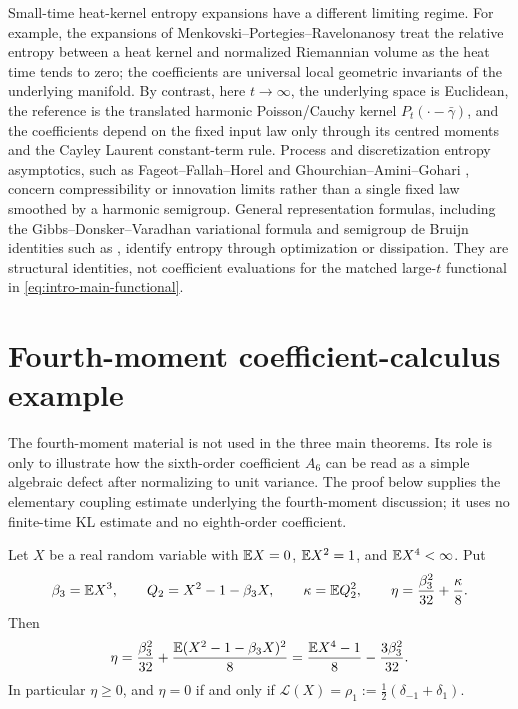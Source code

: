 Small-time heat-kernel entropy expansions have a different limiting regime.
For example, the expansions of
Menkovski--Portegies--Ravelonanosy
\cite{MenkovskiPortegiesRavelonanosy2024HeatKernelEntropy} treat the
relative entropy between a heat kernel and normalized Riemannian volume as the
heat time tends to zero; the coefficients are universal local geometric
invariants of the underlying manifold.  By contrast, here \(t\to\infty\), the
underlying space is Euclidean, the reference is the translated harmonic
Poisson/Cauchy kernel \(P_t(\cdot-\bar\gamma)\), and the coefficients depend
on the fixed input law only through its centred moments and the Cayley Laurent
constant-term rule.  Process and discretization entropy asymptotics, such as
Fageot--Fallah--Horel
\cite{FageotFallahHorel2022EntropicCompressibilityLevy} and
Ghourchian--Amini--Gohari
\cite{GhourchianAminiGohari2018InnovationCompressibility}, concern
compressibility or innovation limits rather than a single fixed law smoothed
by a harmonic semigroup.  General representation formulas, including the
Gibbs--Donsker--Varadhan variational formula
\cite{DonskerVaradhan1975AsymptoticI,DupuisEllis1997WeakConvergence} and
semigroup de Bruijn identities such as
\cite{DeBruijn1953,HirataNemotoYoshida2012IntegralRepresentation,
Yoshida2017RelativeEntropyDiffusion}, identify entropy through optimization
or dissipation.  They are structural identities, not coefficient evaluations
for the matched large-\(t\) functional in
\eqref{eq:intro-main-functional}.

\section{Fourth-moment coefficient-calculus example}%
\label{app:optional-fourth-moment-coefficient-algebra}
\label{app:fourth-moment-coupling-proof}

The fourth-moment material is not used in the three main theorems.  Its role
is only to illustrate how the sixth-order coefficient \(A_6\) can be read as
a simple algebraic defect after normalizing to unit variance.  The proof
below supplies the elementary coupling estimate underlying the
fourth-moment discussion; it uses no finite-time KL estimate and no
eighth-order coefficient.

\begin{lemma}%
\label{lem:appendix-normalized-fourth-moment-defect-algebra}
Let \(X\) be a real random variable with \(\mathbb{E} X=0\), \(\mathbb{E} X^2=1\), and
\(\mathbb{E} X^4<\infty\).  Put
\[
\beta_3=\mathbb{E} X^3,\qquad
Q_2=X^2-1-\beta_3X,\qquad
\kappa=\mathbb{E} Q_2^2,\qquad
\eta=\frac{\beta_3^2}{32}+\frac{\kappa}{8}.
\]
Then
\begin{equation}\label{eq:appendix-normalized-fourth-moment-algebra}
\eta
=\frac{\beta_3^2}{32}+\frac{\mathbb{E}(X^2-1-\beta_3X)^2}{8}
=\frac{\mathbb{E} X^4-1}{8}-\frac{3\beta_3^2}{32}.
\end{equation}
In particular \(\eta\ge0\), and \(\eta=0\) if and only if
\(\mathcal L(X)=\rho_1:=\frac12(\delta_{-1}+\delta_1)\).
\end{lemma}

